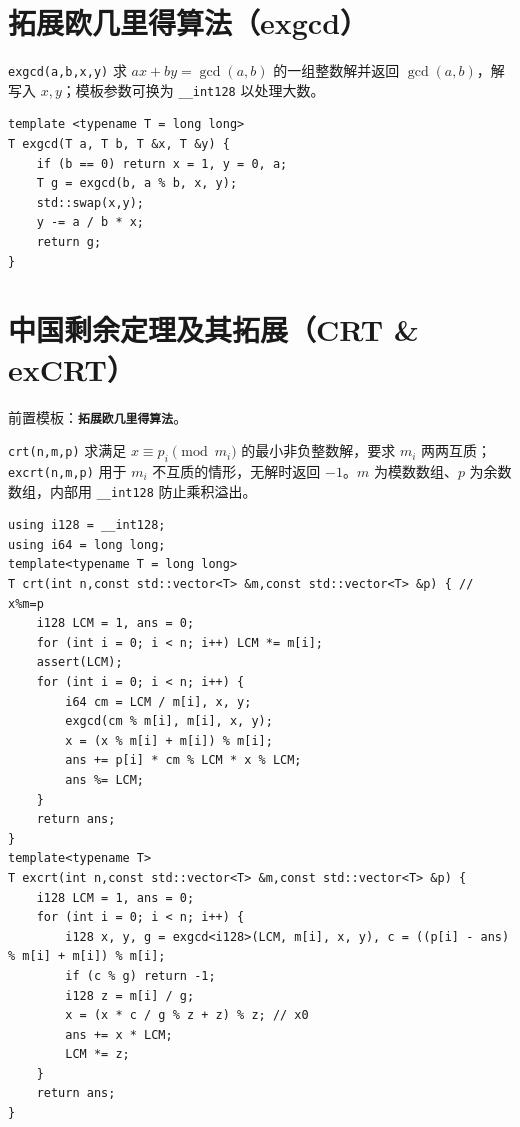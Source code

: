 \section{拓展欧几里得算法（exgcd）}

\verb|exgcd(a,b,x,y)| 求 $ax+by=\gcd(a,b)$ 的一组整数解并返回 $\gcd(a,b)$，解写入 $x,y$；模板参数可换为 \texttt{\_\_int128} 以处理大数。

\begin{lstlisting}
template <typename T = long long>
T exgcd(T a, T b, T &x, T &y) {
    if (b == 0) return x = 1, y = 0, a;
    T g = exgcd(b, a % b, x, y);
    std::swap(x,y);
    y -= a / b * x;
    return g;
}
\end{lstlisting}

\section{中国剩余定理及其拓展（CRT \& exCRT）}

前置模板：\textbf{\texttt{拓展欧几里得算法}}。

\verb|crt(n,m,p)| 求满足 $x\equiv p_i\pmod{m_i}$ 的最小非负整数解，要求 $m_i$ 两两互质；\verb|excrt(n,m,p)| 用于 $m_i$ 不互质的情形，无解时返回 $-1$。$m$ 为模数数组、$p$ 为余数数组，内部用 \texttt{\_\_int128} 防止乘积溢出。

\begin{lstlisting}
using i128 = __int128;
using i64 = long long;
template<typename T = long long>
T crt(int n,const std::vector<T> &m,const std::vector<T> &p) { // x%m=p
    i128 LCM = 1, ans = 0;
    for (int i = 0; i < n; i++) LCM *= m[i];
    assert(LCM);
    for (int i = 0; i < n; i++) {
        i64 cm = LCM / m[i], x, y;
        exgcd(cm % m[i], m[i], x, y);
        x = (x % m[i] + m[i]) % m[i];
        ans += p[i] * cm % LCM * x % LCM;
        ans %= LCM;
    }
    return ans;
}
template<typename T>
T excrt(int n,const std::vector<T> &m,const std::vector<T> &p) {
    i128 LCM = 1, ans = 0;
    for (int i = 0; i < n; i++) {
        i128 x, y, g = exgcd<i128>(LCM, m[i], x, y), c = ((p[i] - ans) % m[i] + m[i]) % m[i];
        if (c % g) return -1;
        i128 z = m[i] / g;
        x = (x * c / g % z + z) % z; // x0
        ans += x * LCM;
        LCM *= z;
    }
    return ans;
}
\end{lstlisting}
